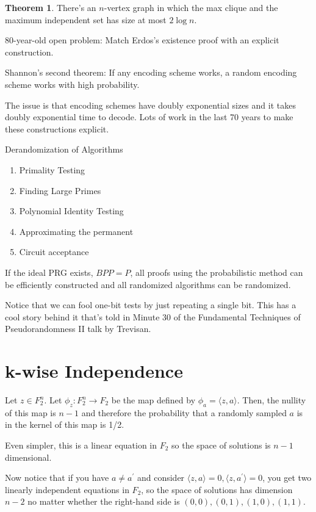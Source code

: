 \documentclass{article}
\theoremstyle{definition}
\newtheorem{theorem}{Theorem}[section]
\begin{document}
\begin{theorem}
    There's an $n$-vertex graph in which the max clique
    and the maximum independent set has size at most
    $2 \log n$.
\end{theorem}

80-year-old open problem: Match Erdos's existence proof with an explicit construction.

Shannon's second theorem: If any encoding scheme works, a random encoding scheme works with
high probability.

The issue is that encoding schemes have doubly exponential sizes and it takes doubly
exponential time to decode. Lots of work in the last 70 years to make these constructions
explicit.

Derandomization of Algorithms

\begin{enumerate}
    \item Primality Testing
    \item Finding Large Primes
    \item Polynomial Identity Testing
    \item Approximating the permanent
    \item Circuit acceptance
\end{enumerate}

If the ideal PRG exists, $BPP = P$, all proofs using the probabilistic
method can be efficiently constructed and all randomized algorithms
can be randomized.

Notice that we can fool one-bit tests by just repeating a single bit.
This has a cool story behind it that's told in Minute 30 of the Fundamental
Techniques of Pseudorandomness II talk by Trevisan.

\newpage

\section{k-wise Independence}

Let $z \in F_{2}^{n}$. Let $\phi_{z}: F_{2}^{n} \xrightarrow{} F_{2}$ be the map
defined by $\phi_{a} = \langle z, a \rangle$. Then, the nullity of this map is
$n - 1$ and therefore the probability that a randomly sampled $a$ is in the kernel
of this map is 1/2.

Even simpler, this is a linear equation in $F_{2}$ so the space of solutions
is $n-1$ dimensional.

Now notice that if you have $a \neq a^{\prime}$ and consider 
$\langle z,a \rangle = 0, \langle z, a^{\prime} \rangle = 0$,
you get two linearly independent equations in $F_{2}$, 
so the space of solutions has dimension $n - 2$ no matter
whether the right-hand side is $(0,0),(0,1),(1,0),(1,1)$.
\end{document}

